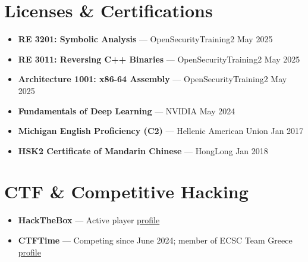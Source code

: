 \documentclass[10pt, a4paper]{article}
\begin{document}
\section{Licenses \& Certifications}

\begin{itemize}
  \item \textbf{RE 3201: Symbolic Analysis} — OpenSecurityTraining2 \hfill May 2025
  \item \textbf{RE 3011: Reversing C++ Binaries} — OpenSecurityTraining2 \hfill May 2025
  \item \textbf{Architecture 1001: x86-64 Assembly} — OpenSecurityTraining2 \hfill May 2025
  \item \textbf{Fundamentals of Deep Learning} — NVIDIA \hfill May 2024
  \item \textbf{Michigan English Proficiency (C2)} — Hellenic American Union \hfill Jan 2017
  \item \textbf{HSK2 Certificate of Mandarin Chinese} — HongLong \hfill Jan 2018
\end{itemize}

\section{CTF \& Competitive Hacking}

\begin{itemize}
  \item \textbf{HackTheBox} — Active player
        \hfill\href{https://app.hackthebox.com/users/771008}{\small profile}

  \item \textbf{CTFTime} — Competing since June 2024; member of ECSC Team Greece
        \hfill\href{https://ctftime.org/user/194776}{\small profile}
\end{itemize}
\end{document}

